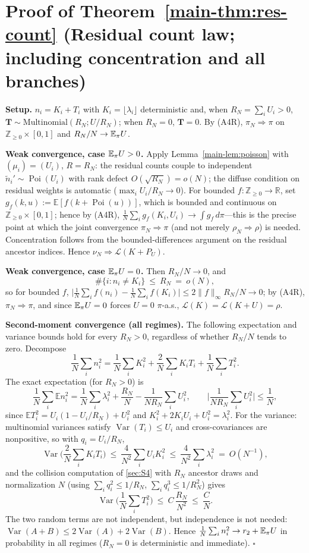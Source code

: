 \section{Proof of Theorem~\ref{main-thm:res-count} (Residual count law; including concentration and all branches)}\label{sec:S14}

\textbf{Setup.} $n_i=K_i+T_i$ with $K_i=\lfloor\lambda_i\rfloor$ deterministic and, when $R_N=\sum_iU_i>0$, $\boldsymbol T\sim\mathrm{Multinomial}(R_N;U/R_N)$; when $R_N=0$, $\boldsymbol T=0$. By (A4R), $\pi_N\Rightarrow\pi$ on $\mathbb Z_{\ge0}\times[0,1]$ and $R_N/N\to\mathbb{E}_\pi U$.

\textbf{Weak convergence, case $\mathbb{E}_\pi U>0$.} Apply Lemma~\ref{main-lem:poisson} with $(\mu_i)=(U_i)$, $R=R_N$: the residual counts couple to independent $\tilde n_i'\sim\operatorname{Poi}(U_i)$ with rank defect $O(\sqrt{R_N})=o(N)$; the diffuse condition on residual weights is automatic ($\max_iU_i/R_N\to0$). For bounded $f:\mathbb Z_{\ge0}\to\mathbb R$, set $g_f(k,u):=\mathbb E[f(k+\operatorname{Poi}(u))]$, which is bounded and continuous on $\mathbb Z_{\ge0}\times[0,1]$; hence by (A4R), $\frac1N\sum_ig_f(K_i,U_i)\to\int g_f\,d\pi$—this is the precise point at which the joint convergence $\pi_N\Rightarrow\pi$ (and not merely $\rho_N\Rightarrow\rho$) is needed. Concentration follows from the bounded-differences argument on the residual ancestor indices. Hence $\nu_N\Rightarrow\mathcal L(K+P_U)$.

\textbf{Weak convergence, case $\mathbb{E}_\pi U=0$.} Then $R_N/N\to0$, and
\[
\#\{i:n_i\neq K_i\}\ \le\ R_N\ =\ o(N),
\]
so for bounded $f$, $\big|\frac1N\sum_if(n_i)-\frac1N\sum_if(K_i)\big|\le2\|f\|_\infty R_N/N\to0$; by (A4R), $\pi_N\Rightarrow\pi$, and since $\mathbb{E}_\pi U=0$ forces $U=0$ $\pi$-a.s., $\mathcal L(K)=\mathcal L(K+U)=\rho$.

\textbf{Second-moment convergence (all regimes).} The following expectation and variance bounds hold for every $R_N>0$, regardless of whether $R_N/N$ tends to zero. Decompose
\[
\frac1N\sum_in_i^2=\frac1N\sum_iK_i^2+\frac2N\sum_iK_iT_i+\frac1N\sum_iT_i^2.
\]
The exact expectation (for $R_N>0$) is
\[
\frac1N\sum_i\mathbb E n_i^2=\frac1N\sum_i\lambda_i^2+\frac{R_N}{N}-\frac1{NR_N}\sum_iU_i^2,\qquad \Big|\frac1{NR_N}\sum_iU_i^2\Big|\le\frac1N,
\]
since $\mathbb ET_i^2=U_i(1-U_i/R_N)+U_i^2$ and $K_i^2+2K_iU_i+U_i^2=\lambda_i^2$. For the variance: multinomial variances satisfy $\operatorname{Var}(T_i)\le U_i$ and cross-covariances are nonpositive, so with $q_i=U_i/R_N$,
\[
\operatorname{Var}\Big(\frac2N\sum_iK_iT_i\Big)\ \le\ \frac4{N^2}\sum_iU_iK_i^2\ \le\ \frac4{N^2}\sum_i\lambda_i^2\ =\ O(N^{-1}),
\]
and the collision computation of \ref{sec:S4} with $R_N$ ancestor draws and normalization $N$ (using $\sum_iq_i^2\le1/R_N$, $\sum_iq_i^3\le1/R_N^2$) gives
\[
\operatorname{Var}\Big(\frac1N\sum_iT_i^2\Big)\ \le\ C\,\frac{R_N}{N^2}\ \le\ \frac CN.
\]
The two random terms are not independent, but independence is not needed: $\operatorname{Var}(A+B)\le2\operatorname{Var}(A)+2\operatorname{Var}(B)$. Hence $\frac1N\sum_in_i^2\to r_2+\mathbb{E}_\pi U$ in probability in all regimes ($R_N=0$ is deterministic and immediate). $\square$

